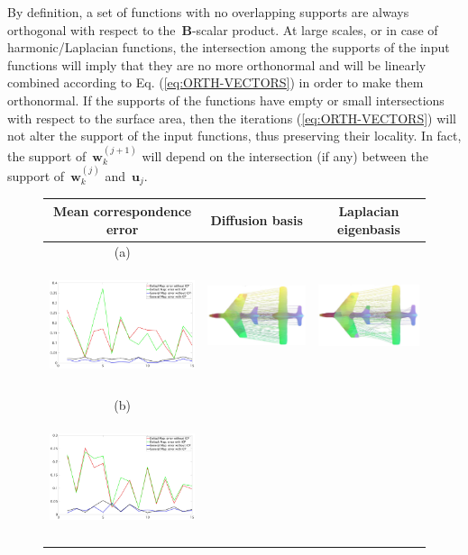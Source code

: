 \documentclass[acmtog,authorversion]{acmart}
\begin{document}
By definition, a set of functions with no overlapping supports are always orthogonal with respect to the~$\mathbf{B}$-scalar product. At large scales, or in case of harmonic/Laplacian functions, the intersection among the supports of the input functions will imply that they are no more orthonormal and will be linearly combined according to Eq. (\ref{eq:ORTH-VECTORS}) in order to make them orthonormal. If the supports of the functions have empty or small intersections with respect to the surface area, then the iterations (\ref{eq:ORTH-VECTORS}) will not alter the support of the input functions, thus preserving their locality. In fact, the support of~$\mathbf{w}_{k}^{(j+1)}$ will depend on the intersection (if any) between the support of~$\mathbf{w}_{k}^{(j)}$ and~$\mathbf{u}_{j}$.
%
\begin{figure}
\begin{tabular}{c|c|c}
Mean correspondence error &Diffusion basis &Laplacian eigenbasis\\
\hline
(a)\includegraphics[height=105pt]{FMAP-images/plane-STATISTICS.jpg}
&\includegraphics[height=85pt]{FMAP-images/plane-Source=61-Target=66-General-Basis.jpg}
&\includegraphics[height=85pt]{FMAP-images/plane-Source=61-Target=66-Lapl-Eig-ZOOM.jpg}\\
(b)\includegraphics[height=105pt]{FMAP-images/table-STATISTICS.jpg}

\end{tabular}
\end{figure}
\end{document}
